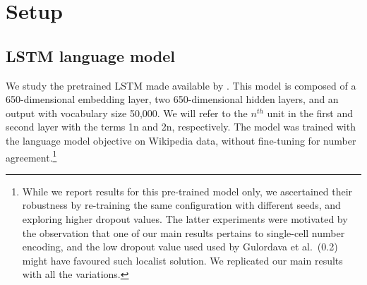 
\section{Setup}


\subsection{LSTM language model}\label{ssec:lstm_lm}
We study the pretrained LSTM made available by
.  This model is composed of a
650-dimensional embedding layer, two 650-dimensional hidden layers,
and an output with vocabulary size 50,000. We will refer to the
$n^{th}$ unit in the first and second layer with the terms \unit{1}{n}
and \unit{2}{n}, respectively. The model was trained with the language
model objective on Wikipedia data, without fine-tuning for number
agreement.\footnote{While we report results for this pre-trained model
  only, we ascertained their robustness by re-training the same
  configuration with different seeds, and exploring higher dropout
  values. The latter experiments were motivated by the observation
  that one of our main results pertains to single-cell number
  encoding, and the low dropout value used used by Gulordava et
  al.~(0.2) might have favoured such localist solution. We replicated
  our main results with all the variations.} 



